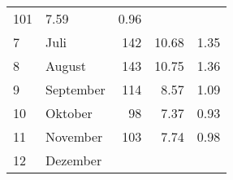 \begin{longtable}{lXrrr}
       \num{101} &
       \num[round-mode=places,round-precision=2]{7.59} &
         \num[round-mode=places,round-precision=2]{0.96} \\

     7 &
     \multicolumn{1}{X}{ Juli   } &


       \num{142} &
       \num[round-mode=places,round-precision=2]{10.68} &
         \num[round-mode=places,round-precision=2]{1.35} \\

     8 &
     \multicolumn{1}{X}{ August   } &


       \num{143} &
       \num[round-mode=places,round-precision=2]{10.75} &
         \num[round-mode=places,round-precision=2]{1.36} \\

     9 &
     \multicolumn{1}{X}{ September   } &


       \num{114} &
       \num[round-mode=places,round-precision=2]{8.57} &
         \num[round-mode=places,round-precision=2]{1.09} \\

     10 &
     \multicolumn{1}{X}{ Oktober   } &


       \num{98} &
       \num[round-mode=places,round-precision=2]{7.37} &
         \num[round-mode=places,round-precision=2]{0.93} \\

     11 &
     \multicolumn{1}{X}{ November   } &


       \num{103} &
       \num[round-mode=places,round-precision=2]{7.74} &
         \num[round-mode=places,round-precision=2]{0.98} \\

     12 &
     \multicolumn{1}{X}{ Dezember   } &



\end{longtable}
